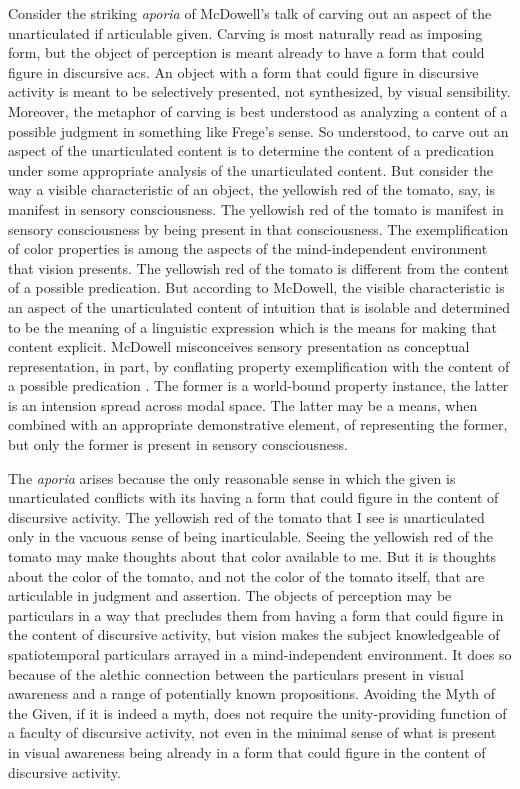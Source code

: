 \documentclass[12pt]{article}
\begin{document}
Consider the striking \emph{aporia} of McDowell's talk of carving out an aspect of the unarticulated if articulable given. Carving is most naturally read as imposing form, but the object of perception is meant already to have a form that could figure in discursive acs. An object with a form that could figure in discursive activity is meant to be selectively presented, not synthesized, by visual sensibility. Moreover, the metaphor of carving is best understood as analyzing a content of a possible judgment in something like Frege's \citeyearpar[§64]{Frege:1884fk} sense. So understood, to carve out an aspect of the unarticulated content is to determine the content of a predication under some appropriate analysis of the unarticulated content. But consider the way a visible characteristic of an object, the yellowish red of the tomato, say, is manifest in sensory consciousness. The yellowish red of the tomato is manifest in sensory consciousness by being present in that consciousness. The exemplification of color properties is among the aspects of the mind-independent environment that vision presents. The yellowish red of the tomato is different from the content of a possible predication. But according to McDowell, the visible characteristic is an aspect of the unarticulated content of intuition that is isolable and determined to be the meaning of a linguistic expression which is the means for making that content explicit. McDowell misconceives sensory presentation as conceptual representation, in part, by conflating property exemplification with the content of a possible predication \citep[see][for a similar criticism of the Woodbridge Lectures]{Johnston:2006uq}. The former is a world-bound property instance, the latter is an intension spread across modal space. The latter may be a means, when combined with an appropriate demonstrative element, of representing the former, but only the former is present in sensory consciousness.

The \emph{aporia} arises because the only reasonable sense in which the given is unarticulated conflicts with its having a form that could figure in the content of discursive activity. The yellowish red of the tomato that I see is unarticulated only in the vacuous sense of being inarticulable. Seeing the yellowish red of the tomato may make thoughts about that color available to me. But it is thoughts about the color of the tomato, and not the color of the tomato itself, that are articulable in judgment and assertion. The objects of perception may be particulars in a way that precludes them from having a form that could figure in the content of discursive activity, but vision makes the subject knowledgeable of spatiotemporal particulars arrayed in a mind-independent environment. It does so because of the alethic connection between the particulars present in visual awareness and a range of potentially known propositions. Avoiding the Myth of the Given, if it is indeed a myth, does not require the unity-providing function of a faculty of discursive activity, not even in the minimal sense of what is present in visual awareness being already in a form that could figure in the content of discursive activity.
\end{document}
